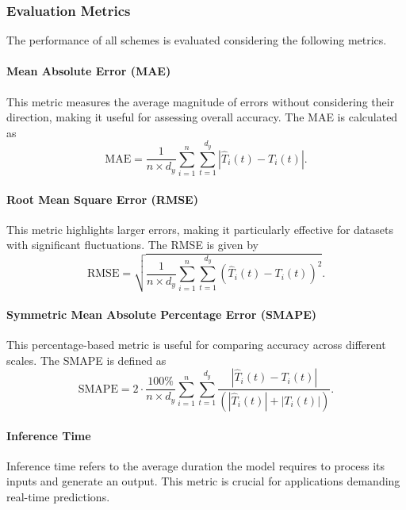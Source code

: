\documentclass{ieeetmlcn}
\begin{document}
\subsubsection{\textbf{Evaluation Metrics}}
The performance of all schemes is evaluated considering the following metrics.

\paragraph*{Mean Absolute Error (MAE)}
This metric measures the average magnitude of errors without considering their direction, making it useful for assessing overall accuracy. The MAE is calculated as
\begin{equation}
  \text{MAE} = \frac{1}{n \times d_y} \sum_{i=1}^{n} \sum_{t=1}^{d_y} \left| \hat{T}_i(t) - T_i(t) \right|.
\end{equation}

\paragraph*{Root Mean Square Error (RMSE)}
This metric highlights larger errors, making it particularly effective for datasets with significant fluctuations. The RMSE is given by
\begin{equation}
  \text{RMSE} = \sqrt{\frac{1}{n \times d_y} \sum_{i=1}^{n} \sum_{t=1}^{d_y} \left( \hat{T}_i(t) - T_i(t) \right)^2}.
\end{equation}

\paragraph*{Symmetric Mean Absolute Percentage Error (SMAPE)}
This percentage-based metric is useful for comparing accuracy across different scales. The SMAPE is defined as
\begin{equation}
  \text{SMAPE} = 2 \cdot \frac{100\%}{n \times d_y} \sum_{i=1}^{n} \sum_{t=1}^{d_y} \frac{\left| \hat{T}_i(t) - T_i(t) \right|}{\left( \left| \hat{T}_i(t) \right| + \left| T_i(t) \right| \right)}.
\end{equation}

\paragraph*{Inference Time}
Inference time refers to the average duration the model requires to process its inputs and generate an output. This metric is crucial for applications demanding real-time predictions.
\end{document}
